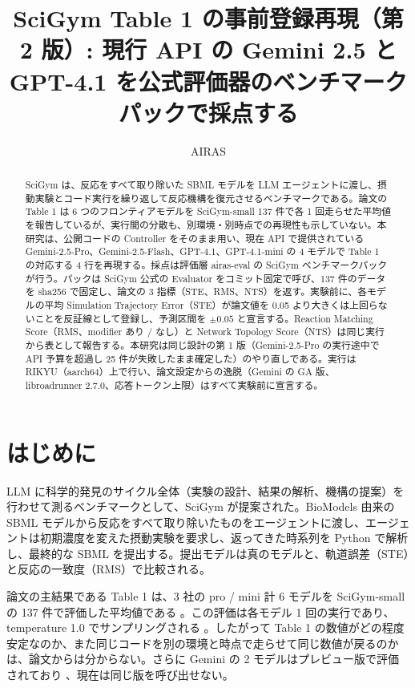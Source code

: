 \documentclass{article}
\title{SciGym Table 1 の事前登録再現（第 2 版）: 現行 API の Gemini 2.5 と GPT-4.1 を公式評価器のベンチマークパックで採点する}
\author{AIRAS}
\begin{document}
\maketitle

\begin{abstract}
SciGym \citep{duan-2025-measuring} は、反応をすべて取り除いた SBML モデルを LLM エージェントに渡し、摂動実験とコード実行を繰り返して反応機構を復元させるベンチマークである。論文の Table 1 は 6 つのフロンティアモデルを SciGym-small 137 件で各 1 回走らせた平均値を報告しているが、実行間の分散も、別環境・別時点での再現性も示していない。本研究は、公開コードの Controller をそのまま用い、現在 API で提供されている Gemini-2.5-Pro、Gemini-2.5-Flash、GPT-4.1、GPT-4.1-mini の 4 モデルで Table 1 の対応する 4 行を再現する。採点は評価層 airas-eval の SciGym ベンチマークパック \citep{airasorg-2026-airas} が行う。パックは SciGym 公式の Evaluator をコミット固定で呼び、137 件のデータを sha256 で固定し、論文の 3 指標（STE、RMS、NTS）を返す。実験前に、各モデルの平均 Simulation Trajectory Error（STE）が論文値を 0.05 より大きくは上回らないことを反証線として登録し、予測区間を $\pm 0.05$ と宣言する。Reaction Matching Score（RMS、modifier あり / なし）と Network Topology Score（NTS）は同じ実行から表として報告する。本研究は同じ設計の第 1 版（Gemini-2.5-Pro の実行途中で API 予算を超過し 25 件が失敗したまま確定した）のやり直しである。実行は RIKYU（aarch64）上で行い、論文設定からの逸脱（Gemini の GA 版、libroadrunner 2.7.0、応答トークン上限）はすべて実験前に宣言する。
\end{abstract}

\section{はじめに}
\label{sec:intro}
LLM に科学的発見のサイクル全体（実験の設計、結果の解析、機構の提案）を行わせて測るベンチマークとして、SciGym \citep{duan-2025-measuring} が提案された。BioModels 由来の SBML モデルから反応をすべて取り除いたものをエージェントに渡し、エージェントは初期濃度を変えた摂動実験を要求し、返ってきた時系列を Python で解析し、最終的な SBML を提出する。提出モデルは真のモデルと、軌道誤差（STE）と反応の一致度（RMS）で比較される。

論文の主結果である Table 1 は、3 社の pro / mini 計 6 モデルを SciGym-small の 137 件で評価した平均値である \cite[s1.p10]{duan-2025-measuring}。この評価は各モデル 1 回の実行であり、temperature 1.0 でサンプリングされる \cite[s2.p1]{h4duan-2025-scigym}。したがって Table 1 の数値がどの程度安定なのか、また同じコードを別の環境と時点で走らせて同じ数値が戻るのかは、論文からは分からない。さらに Gemini の 2 モデルはプレビュー版で評価されており \cite[s1.p1]{duan-2025-measuring}、現在は同じ版を呼び出せない。
\end{document}
